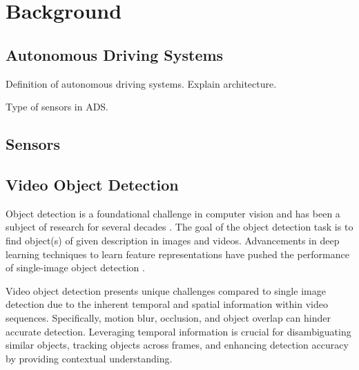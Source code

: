 \section{Background}  \label{Background}

\subsection{Autonomous Driving Systems} \label{Background:ADS}


Definition of autonomous driving systems. Explain architecture.

Type of sensors in ADS.

\subsection{Sensors} \label{Background:Sensors}



\subsection{Video Object Detection} \label{Background:VideoObjectDetection}


Object detection is a foundational challenge in computer vision and has been a subject of research for several decades \cite{fischlerRepresentationMatchingPictorial1973}. The goal of the object detection task is to find object(s) of given description in images and videos. Advancements in deep learning techniques to learn feature representations  \cite{hintonReducingDimensionalityData2006, lecunDeepLearning2015} have pushed the performance of single-image object detection \cite{girshickRichFeatureHierarchies2014a}.


Video object detection presents unique challenges compared to single image detection due to the inherent temporal and spatial information within video sequences. Specifically, motion blur, occlusion, and object overlap can hinder accurate detection. Leveraging temporal information is crucial for disambiguating similar objects, tracking objects across frames, and enhancing detection accuracy by providing contextual understanding.

